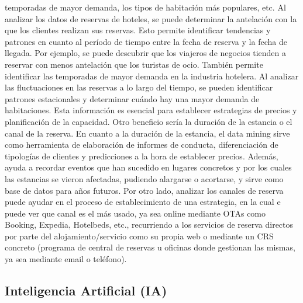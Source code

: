 \documentclass[
  letterpaper,
  DIV=11,
  numbers=noendperiod]{scrreprt}
\begin{document}
temporadas de mayor demanda, los tipos de habitación más populares, etc.
Al analizar los datos de reservas de hoteles, se puede determinar la
antelación con la que los clientes realizan sus reservas. Esto permite
identificar tendencias y patrones en cuanto al período de tiempo entre
la fecha de reserva y la fecha de llegada. Por ejemplo, se puede
descubrir que los viajeros de negocios tienden a reservar con menos
antelación que los turistas de ocio. También permite identificar las
temporadas de mayor demanda en la industria hotelera. Al analizar las
fluctuaciones en las reservas a lo largo del tiempo, se pueden
identificar patrones estacionales y determinar cuándo hay una mayor
demanda de habitaciones. Esta información es esencial para establecer
estrategias de precios y planificación de la capacidad. Otro beneficio
sería la duración de la estancia o el canal de la reserva. En cuanto a
la duración de la estancia, el data mining sirve como herramienta de
elaboración de informes de conducta, diferenciación de tipologías de
clientes y predicciones a la hora de establecer precios. Además, ayuda a
recordar eventos que han sucedido en lugares concretos y por los cuales
las estancias se vieron afectadas, pudiendo alargarse o acortarse, y
sirve como base de datos para años futuros. Por otro lado, analizar los
canales de reserva puede ayudar en el proceso de establecimiento de una
estrategia, en la cual e puede ver que canal es el más usado, ya sea
online mediante OTAs como Booking, Expedia, Hotelbeds, etc., recurriendo
a los servicios de reserva directos por parte del alojamiento/servicio
como su propia web o mediante un CRS concreto (programa de central de
reservas u oficinas donde gestionan las mismas, ya sea mediante email o
teléfono).

\hypertarget{inteligencia-artificial-ia}{%
\subsection{Inteligencia Artificial
(IA)}\label{inteligencia-artificial-ia}}
\end{document}
